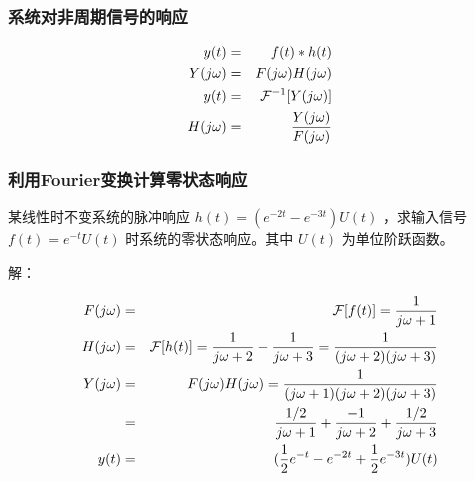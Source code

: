 \documentclass{beamer}
\begin{document}
\begin{frame}
\frametitle{系统对非周期信号的响应}
\label{sec-6-4}

\begin{eqnarray*}
y(t) & =& f(t)*h(t)\\
Y(j\omega) &=& F(j\omega)H(j\omega)\\
y(t) &=& {\cal F}^{-1}[Y(j\omega)] \\
H(j\omega) &=& \frac{Y(j\omega)}{F(j\omega)}
\end{eqnarray*}
\end{frame}
\begin{frame}
\frametitle{利用Fourier变换计算零状态响应}
\label{sec-6-5}

某线性时不变系统的脉冲响应 $h(t)=(e^{-2t}-e^{-3t})U(t)$ ，求输入信号 $f(t)=e^{-t}U(t)$ 时系统的零状态响应。其中 $U(t)$ 为单位阶跃函数。

解：

\begin{eqnarray*}
F(j\omega) & =& {\cal F}[f(t)] = \frac{1}{j\omega+1} \\ H(j\omega) &=& {\cal F}[h(t)] = \frac{1}{j\omega+2}-\frac{1}{j\omega+3}=\frac{1}{(j\omega+2)(j\omega+3)}\\
Y(j\omega) &=& F(j\omega)H(j\omega) = \frac{1}{(j\omega+1)(j\omega+2)(j\omega+3)}\\
           &=& \frac{1/2}{j\omega+1}+\frac{-1}{j\omega+2}+\frac{1/2}{j\omega+3}\\
y(t) &=& (\frac{1}{2}e^{-t}-e^{-2t}+\frac{1}{2}e^{-3t})U(t)
\end{eqnarray*}
\end{frame}
\end{document}
